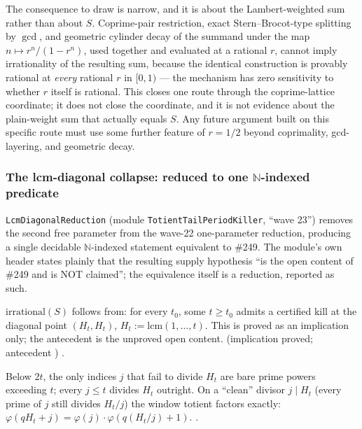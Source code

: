 \begin{obs}
The consequence to draw is narrow, and it is about the Lambert-weighted sum
rather than about $S$. Coprime-pair restriction, exact Stern--Brocot-type
splitting by $\gcd$, and geometric cylinder decay of the summand under the
map $n\mapsto r^n/(1-r^n)$, used together and evaluated at a rational $r$,
cannot imply irrationality of the resulting sum, because the identical
construction is provably rational at \emph{every} rational $r$ in $[0,1)$ ---
the mechanism has zero sensitivity to whether $r$ itself is rational. This
closes one route through the coprime-lattice coordinate; it does not close
the coordinate, and it is not evidence about the plain-weight sum that
actually equals $S$. Any future argument built on this specific route must
use some further feature of $r=1/2$ beyond coprimality, gcd-layering, and
geometric decay.
\end{obs}

\subsubsection{The lcm-diagonal collapse: reduced to one \texorpdfstring{$\mathbb{N}$}{N}-indexed predicate}

\texttt{LcmDiagonalReduction} (module \texttt{TotientTailPeriodKiller},
``wave 23'') removes the second free parameter from the wave-22
one-parameter reduction, producing a single decidable $\mathbb{N}$-indexed
statement equivalent to \#249. The module's own header states plainly that
the resulting supply hypothesis ``is the open content of \#249 and is NOT
claimed''; the equivalence itself is a reduction, reported as such.

\begin{obs}
$\mathrm{irrational}(S)$ follows from: for every $t_0$, some $t\ge t_0$
admits a certified kill at the diagonal point $(H_t,H_t)$, $H_t :=
\mathrm{lcm}(1,\dots,t)$. This is proved as an implication only; the
antecedent is the unproved open content.
\quad {} (implication proved; antecedent )
\quad {} \quad {}.
\end{obs}

\begin{thm}
Below $2t$, the only indices $j$ that fail to divide $H_t$ are bare prime
powers exceeding $t$; every $j\le t$ divides $H_t$ outright. On a ``clean''
divisor $j\mid H_t$ (every prime of $j$ still divides $H_t/j$) the window
totient factors exactly:
$\varphi(qH_t+j) = \varphi(j)\cdot\varphi(q(H_t/j)+1)$.
\quad {}
\quad {} \quad {} \quad {}.
\end{thm}

